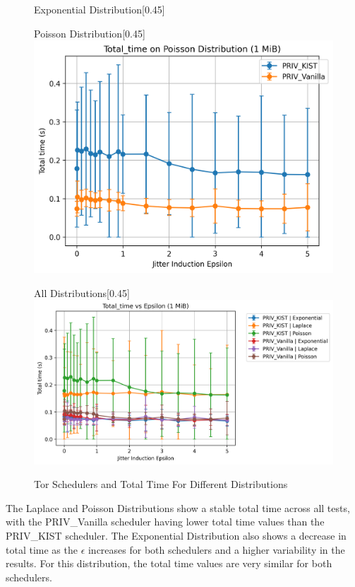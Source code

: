 \begin{figure}[htbp]
\begin{subcaptionbox}{Exponential Distribution\label{fig:jitter_total_time_exponential}}[0.45\textwidth]
    \end{subcaptionbox}
    \hfill
    \begin{subcaptionbox}{Poisson Distribution\label{fig:jitter_total_time_poisson}}[0.45\textwidth]
        {\includegraphics[width=\linewidth]{Chapters/Figures/Plots/Jitter/total_time_jitter_Poisson_1_mib.png}}
    \end{subcaptionbox}
    \hfill
    \begin{subcaptionbox}{All Distributions\label{fig:jitter_total_time_all}}[0.45\textwidth]
        {\includegraphics[width=\linewidth]{Chapters/Figures/Plots/Jitter/total_time_jitter_1_mib.png}}
    \end{subcaptionbox}
    \caption{Tor Schedulers and Total Time For Different Distributions}\label{fig:jitter_total_time_analysis}
\end{figure}

The Laplace and Poisson Distributions show a stable total time across all tests, with the PRIV\_Vanilla scheduler having lower total time values than the PRIV\_KIST scheduler. The Exponential Distribution also shows a decrease in total time as the $\epsilon$ increases for both schedulers and a higher variability in the results. For this distribution, the total time values are very similar for both schedulers.

